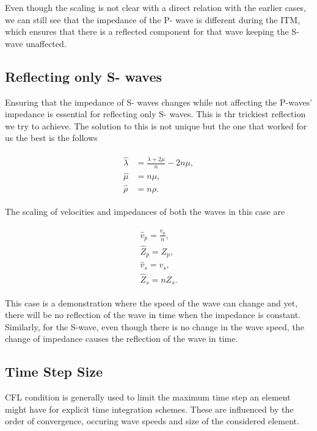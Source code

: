 Even though the scaling is not clear with a direct relation with the earlier cases, we can still see that the impedance of the P- wave is different during the \ac{ITM}, 
which ensures that there is a reflected component for that wave keeping the S-wave unaffected. \\

\subsection{Reflecting only S- waves}

Ensuring that the impedance of S- waves changes while not affecting the P-waves' impedance is essential for reflecting only S- waves. This is thr trickiest
reflection we try to achieve. The solution to this is not unique but the one that worked for us the best is the follows

\begin{align}
    \begin{split}
        \hat{\lambda} &= \frac{\lambda + 2 \mu}{n} -  2n \mu ,\\
        \hat{\mu} &= n \mu ,\\
        \hat{\rho} &= n \rho .
    \end{split}
\end{align}

The scaling of velocities and impedances of both the waves in this case are 

\begin{align}
    \begin{split}
        \hat{v}_p = \frac{v_p}{n} ,\\
        \hat{Z}_p = Z_p ,\\
        \hat{v}_s = v_s ,\\
        \hat{Z}_s = n Z_s .
    \end{split}
\end{align}

This case is a demonstration where the speed of the wave can change and yet, there will be no reflection of the wave in time when the impedance is constant.
Similarly, for the S-wave, even though there is no change in the wave speed, the change of impedance causes the reflection of the wave in time. \\

\subsection{Time Step Size}
\ac{CFL} condition is generally used to limit the maximum time step an element might have for explicit time integration schemes. These are influenced by the order
of convergence, occuring wave speeds and size of the considered element. \\

